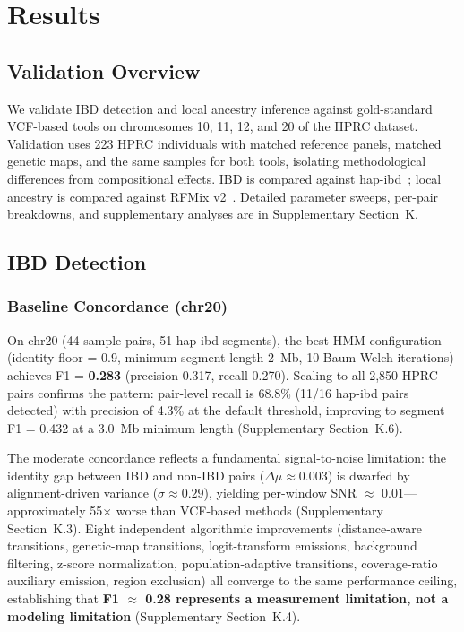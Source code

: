 \section{Results}
\label{sec:results}

\subsection{Validation Overview}

We validate IBD detection and local ancestry inference against gold-standard VCF-based tools on chromosomes 10, 11, 12, and 20 of the HPRC dataset. Validation uses 223 HPRC individuals with matched reference panels, matched genetic maps, and the same samples for both tools, isolating methodological differences from compositional effects. IBD is compared against hap-ibd~\cite{browning2020hap_ibd}; local ancestry is compared against RFMix v2~\cite{maples2013rfmix}. Detailed parameter sweeps, per-pair breakdowns, and supplementary analyses are in Supplementary Section~K.

\subsection{IBD Detection}
\label{sec:results_ibd_validation}

\subsubsection{Baseline Concordance (chr20)}

On chr20 (44 sample pairs, 51 hap-ibd segments), the best HMM configuration (identity floor = 0.9, minimum segment length 2~Mb, 10 Baum-Welch iterations) achieves F1 = \textbf{0.283} (precision 0.317, recall 0.270). Scaling to all 2,850 HPRC pairs confirms the pattern: pair-level recall is 68.8\% (11/16 hap-ibd pairs detected) with precision of 4.3\% at the default threshold, improving to segment F1 = 0.432 at a 3.0~Mb minimum length (Supplementary Section~K.6).

The moderate concordance reflects a fundamental signal-to-noise limitation: the identity gap between IBD and non-IBD pairs ($\Delta\mu \approx 0.003$) is dwarfed by alignment-driven variance ($\sigma \approx 0.29$), yielding per-window SNR $\approx$ 0.01---approximately 55$\times$ worse than VCF-based methods (Supplementary Section~K.3). Eight independent algorithmic improvements (distance-aware transitions, genetic-map transitions, logit-transform emissions, background filtering, z-score normalization, population-adaptive transitions, coverage-ratio auxiliary emission, region exclusion) all converge to the same performance ceiling, establishing that \textbf{F1 $\approx$ 0.28 represents a measurement limitation, not a modeling limitation} (Supplementary Section~K.4).

